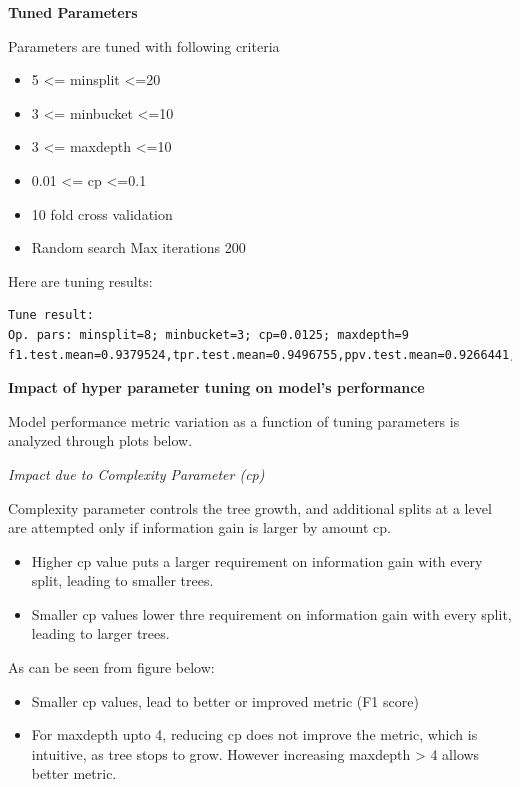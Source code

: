 \documentclass[
]{article}
\providecommand{\tightlist}{%
  \setlength{\itemsep}{0pt}\setlength{\parskip}{0pt}}
\begin{document}
\textbf{Tuned Parameters}

Parameters are tuned with following criteria

\begin{itemize}
\tightlist
\item
  5 \textless= minsplit \textless=20
\item
  3 \textless= minbucket \textless=10
\item
  3 \textless= maxdepth \textless=10
\item
  0.01 \textless= cp \textless=0.1
\item
  10 fold cross validation
\item
  Random search Max iterations 200
\end{itemize}

Here are tuning results:

\begin{verbatim}
Tune result:
Op. pars: minsplit=8; minbucket=3; cp=0.0125; maxdepth=9
f1.test.mean=0.9379524,tpr.test.mean=0.9496755,ppv.test.mean=0.9266441,tnr.test.mean=0.7823693
\end{verbatim}

\textbf{Impact of hyper parameter tuning on model's performance}

Model performance metric variation as a function of tuning parameters is
analyzed through plots below.

\emph{Impact due to Complexity Parameter (cp)}

Complexity parameter controls the tree growth, and additional splits at
a level are attempted only if information gain is larger by amount cp.~

\begin{itemize}
\tightlist
\item
  Higher cp value puts a larger requirement on information gain with
  every split, leading to smaller trees.
\item
  Smaller cp values lower thre requirement on information gain with
  every split, leading to larger trees.
\end{itemize}

As can be seen from figure below:

\begin{itemize}
\tightlist
\item
  Smaller cp values, lead to better or improved metric (F1 score)
\item
  For maxdepth upto 4, reducing cp does not improve the metric, which is
  intuitive, as tree stops to grow. However increasing maxdepth
  \textgreater{} 4 allows better metric.
\end{itemize}
\end{document}
